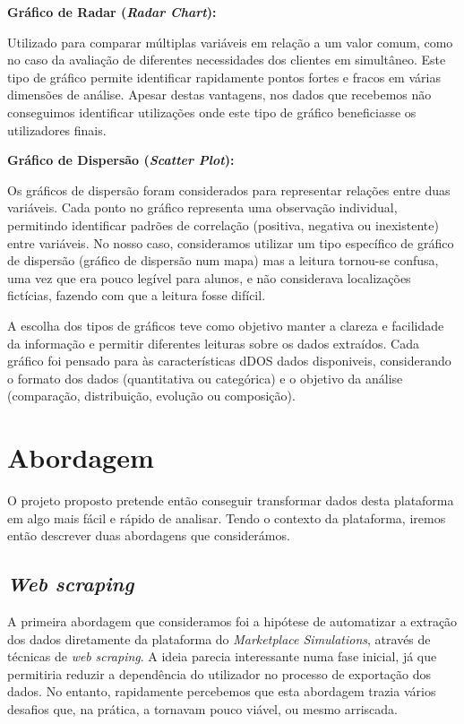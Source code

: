 \textbf{Gráfico de Radar (\textit{Radar Chart}):}  

Utilizado para comparar múltiplas variáveis em relação a um valor comum, como no caso da avaliação de diferentes necessidades dos clientes em simultâneo. Este tipo de gráfico permite identificar rapidamente pontos fortes e fracos em várias dimensões de análise. Apesar destas vantagens, nos dados que recebemos não conseguimos identificar utilizações onde este tipo de gráfico beneficiasse os utilizadores finais.

\textbf{Gráfico de Dispersão (\textit{Scatter Plot}):}

Os gráficos de dispersão foram considerados para representar relações entre duas variáveis. Cada ponto no gráfico representa uma observação individual, permitindo identificar padrões de correlação (positiva, negativa ou inexistente) entre variáveis. No nosso caso, consideramos utilizar um tipo específico de gráfico de dispersão (gráfico de dispersão num mapa) mas a leitura tornou-se confusa, uma vez que era pouco legível para alunos, e não considerava localizações fictícias, fazendo com que a leitura fosse difícil.

A escolha dos tipos de gráficos teve como objetivo manter a clareza e facilidade da informação e permitir diferentes leituras sobre os dados extraídos. Cada gráfico foi pensado para às características dDOS dados disponiveis, considerando o formato dos dados (quantitativa ou categórica) e o objetivo da análise (comparação, distribuição, evolução ou composição).

\section{Abordagem}
\label{sec:abordagem}

O projeto proposto pretende então conseguir transformar dados desta plataforma em algo mais fácil e rápido de analisar. Tendo o contexto da plataforma, iremos então descrever duas abordagens que considerámos.

\subsection{\textit{Web \textit{scraping}}}

A primeira abordagem que consideramos foi a hipótese de automatizar a extração dos dados diretamente da plataforma do \textit{Marketplace Simulations}, através de técnicas de \textit{web} \textit{scraping}. A ideia parecia interessante numa fase inicial, já que permitiria reduzir a dependência do utilizador no processo de exportação  dos dados. No entanto, rapidamente percebemos que esta abordagem trazia vários desafios que, na prática, a tornavam pouco viável, ou mesmo arriscada.

